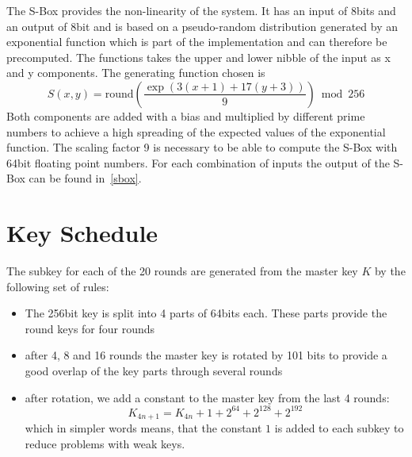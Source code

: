 \documentclass[a4paper]{article}
\begin{document}
    The S-Box provides the non-linearity of the system. It has an input of 8bits and an output of 8bit and is based on a pseudo-random distribution generated by an exponential function which is part of the implementation and can therefore be precomputed. The functions takes the upper and lower nibble of the input as x and y components. The generating function chosen is
$$
S(x,y) = \mathrm{round} \left( \frac{\exp \left(3(x+1) + 17(y+3)\right)}{9} \right) \bmod 256
$$
Both components are added with a bias and multiplied by different prime numbers to achieve a high spreading of the expected values of the exponential function. The scaling factor 9 is necessary to be able to compute the S-Box with 64bit floating point numbers. For each combination of inputs the output of the S-Box can be found in~\ref{sbox}.
\section{Key Schedule}
The subkey for each of the 20 rounds are generated from the master key $K$ by the following set of rules:
\begin{itemize}
    \item The 256bit key is split into 4 parts of 64bits each. These parts provide the round keys for four rounds
    \item after 4, 8 and 16 rounds the master key is rotated by 101 bits to provide a good overlap of the key parts through several rounds
    \item after rotation, we add a constant to the master key from the last 4 rounds: $$K_{4n+1} = K_{4n} + 1 + 2^{64} + 2^{128} + 2^{192}$$ which in simpler words means, that the constant $1$ is added to each subkey to reduce problems with weak keys.
\end{itemize}
	
\end{document}
